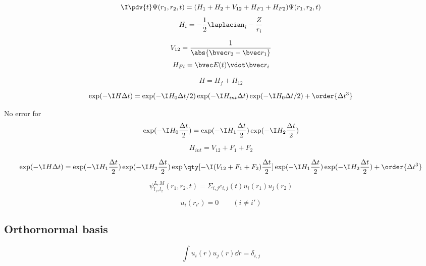 

\begin{equation}
\I \pdv{t}\Psi(r_1, r_2, t) = (H_1 + H_2 + V_{12} + H_{F1} + H_{F2})\Psi(r_1, r_2, t)
\end{equation}
\begin{equation}
H_i = -\frac{1}{2} \laplacian_i - \frac{Z}{r_i}
\end{equation}

\begin{equation}
V_{12} = \frac{1}{\abs{\bvec r_2 - \bvec r_1}}
\end{equation}
\begin{equation}
H_{Fi} = \bvec E(t) \vdot \bvec r_i
\end{equation}

\begin{equation}
H = H_f + H_{12}
\end{equation}

\begin{equation}
\exp(-\I H \Delta t) = \exp(-\I H_0 \Delta t/2) \exp(-\I H_{int}\Delta t) \exp(-\I H_0 \Delta t/2) + \order{\Delta t^3}
\end{equation}

No error for
\begin{equation}
\exp(-\I H_0 \frac{\Delta t}{2}) = \exp(-\I H_{1} \frac{\Delta t}{2}) \exp(-\I H_2 \frac{\Delta t}{2})
\end{equation}

\begin{equation}
H_{int} = V_{12} + F_1 + F_2
\end{equation}

\begin{equation}
\exp(-\I H\Delta t) = \exp(-\I H_{1} \frac{\Delta t}{2}) \exp(-\I H_2 \frac{\Delta t}{2}) \exp\qty[-\I (V_{12} + F_1 + F_2) \frac{\Delta t}{2}] \exp(-\I H_{1} \frac{\Delta t}{2}) \exp(-\I H_{2} \frac{\Delta t}{2}) + \order{\Delta t^3}
\end{equation}

\begin{equation}
\psi_{l_1,l_2}^{L,M}(r_1, r_2, t) = \Sigma_{i,j} c_{i,j}(t) u_i(r_1) u_j(r_2)
\end{equation}

\begin{equation}
u_i(r_{i'}) = 0 \qquad (i \ne i')
\end{equation}

\subsection{Orthornormal basis}
\begin{equation}
\int u_i(r)u_j(r) \dd{r} = \delta_{i,j}
\end{equation}

